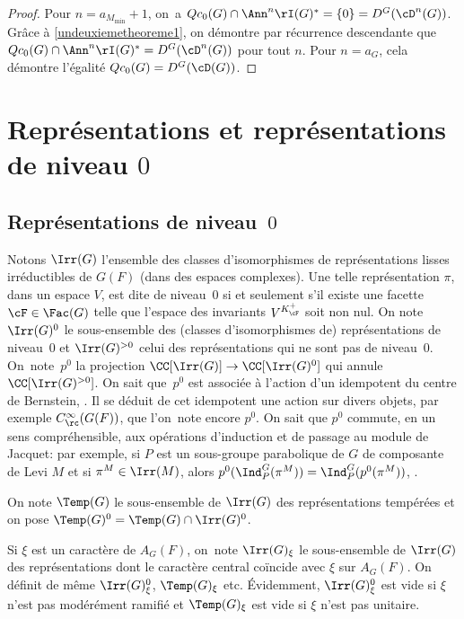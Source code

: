 \begin{proof}
Pour $n=a_{M_{\min}}+1$, on~a $Qc_{0}(G)\cap \Ann^n\rI(G)^*=\{0\}=D^G(\cD^n(G))$. Grâce à \eqref{undeuxiemetheoreme1}, on démontre par récurrence descendante que $Qc_{0}(G)\cap \Ann^n\rI(G)^*=D^G(\cD^n(G))$ pour tout $n$. Pour $n=a_{G}$, cela démontre l'égalité $Qc_{0}(G)=D^G(\cD(G))$.
\end{proof}

\section{Représentations et représentations de niveau \texorpdfstring{$0$}{0}}\label{representations}

\subsection{Représentations de niveau~\texorpdfstring{$0$}{0}}
Notons $\Irr(G)$ l'ensemble des classes d'isomorphismes de représentations lisses irréductibles de $G(F)$ (dans des espaces complexes). Une telle représentation $\pi$, dans un espace $V$, est dite de niveau~$0$ si et seulement s'il existe une facette $\cF\in \Fac(G)$ telle que l'espace des invariants $V^{K_{\cF}^+}$ soit non nul. On note $\Irr(G)^0$ le sous-ensemble des (classes d'isomorphismes de) représentations de niveau~$0$ et $\Irr(G)^{>0}$ celui des représentations qui ne sont pas de niveau~$0$. On~note~$p^0 $ la projection $\CC[\Irr(G)]\to \CC[\Irr(G)^0]$ qui annule $\CC[\Irr(G)^{>0}]$. On sait que~$p^0$ est associée à l'action d'un idempotent du centre de Bernstein, \cf \cite[Cor.\,3.9(i)]{B}. Il se déduit de cet idempotent une action sur divers objets, par exemple $C_{\rc}^{\infty}(G(F))$, que l'on~note encore $p^0$. On sait que $p^0$ commute, en un sens compréhensible, aux opérations d'induction et de passage au module de Jacquet: par exemple, si $P$ est un sous-groupe parabolique de $G$ de composante de Levi $M$ et si $\pi^M\in \Irr(M)$, alors $p^0(\Ind_{P}^G(\pi^M))=\Ind_{P}^G(p^0(\pi^M))$, \cf \cite[Th.\,5.2]{MP}.

On note $\Temp(G)$ le sous-ensemble de $\Irr(G)$ des représentations tempérées et on pose $\Temp(G)^0=\Temp(G)\cap \Irr(G)^0$.

Si $\xi$ est un caractère de $A_{G}(F)$, on~note $\Irr(G)_{\xi}$ le sous-ensemble de $\Irr(G)$ des représentations dont le caractère central coïncide avec $\xi$ sur $A_{G}(F)$. On définit de même $\Irr(G)_{\xi}^0$, $\Temp(G)_{\xi}$ etc. Évidemment, $\Irr(G)_{\xi}^0$ est vide si $\xi$ n'est pas modérément ramifié et $\Temp(G)_{\xi}$ est vide si $\xi$ n'est pas unitaire.

